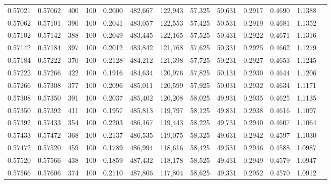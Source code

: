 \begin{tabular}{rrrrrrrrrrrrr}
0.57021 & 0.57062 &   400 & 100 &                                     0.2000 & 482,667 & 122,943 &  57,325 &  50,631 & 0.2917 & 0.4690 & 1.1388 \\
0.57062 & 0.57101 &   390 & 100 &                                     0.2041 & 483,057 & 122,553 &  57,425 &  50,531 & 0.2919 & 0.4681 & 1.1352 \\
0.57102 & 0.57142 &   388 & 100 &                                     0.2049 & 483,445 & 122,165 &  57,525 &  50,431 & 0.2922 & 0.4671 & 1.1316 \\
0.57142 & 0.57184 &   397 & 100 &                                     0.2012 & 483,842 & 121,768 &  57,625 &  50,331 & 0.2925 & 0.4662 & 1.1279 \\
0.57184 & 0.57222 &   370 & 100 &                                     0.2128 & 484,212 & 121,398 &  57,725 &  50,231 & 0.2927 & 0.4653 & 1.1245 \\
0.57222 & 0.57266 &   422 & 100 &                                     0.1916 & 484,634 & 120,976 &  57,825 &  50,131 & 0.2930 & 0.4644 & 1.1206 \\
0.57266 & 0.57308 &   377 & 100 &                                     0.2096 & 485,011 & 120,599 &  57,925 &  50,031 & 0.2932 & 0.4634 & 1.1171 \\
0.57308 & 0.57350 &   391 & 100 &                                     0.2037 & 485,402 & 120,208 &  58,025 &  49,931 & 0.2935 & 0.4625 & 1.1135 \\
0.57350 & 0.57392 &   411 & 100 &                                     0.1957 & 485,813 & 119,797 &  58,125 &  49,831 & 0.2938 & 0.4616 & 1.1097 \\
0.57392 & 0.57433 &   354 & 100 &                                     0.2203 & 486,167 & 119,443 &  58,225 &  49,731 & 0.2940 & 0.4607 & 1.1064 \\
0.57433 & 0.57472 &   368 & 100 &                                     0.2137 & 486,535 & 119,075 &  58,325 &  49,631 & 0.2942 & 0.4597 & 1.1030 \\
0.57472 & 0.57520 &   459 & 100 &                                     0.1789 & 486,994 & 118,616 &  58,425 &  49,531 & 0.2946 & 0.4588 & 1.0987 \\
0.57520 & 0.57566 &   438 & 100 &                                     0.1859 & 487,432 & 118,178 &  58,525 &  49,431 & 0.2949 & 0.4579 & 1.0947 \\
0.57566 & 0.57606 &   374 & 100 &                                     0.2110 & 487,806 & 117,804 &  58,625 &  49,331 & 0.2952 & 0.4570 & 1.0912 \\

\end{tabular}
